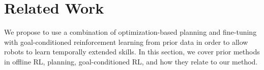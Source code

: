 \section{Related Work}


We propose to use a combination of optimization-based planning and fine-tuning with goal-conditioned reinforcement learning from prior data in order to allow robots to learn temporally extended skills.
In this section, we cover prior methods in offline RL, planning, goal-conditioned RL,
and how they relate to our method.

